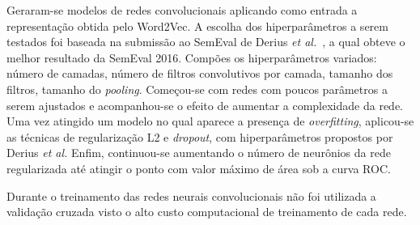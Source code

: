 Geraram-se modelos de redes convolucionais aplicando como entrada a representação obtida pelo Word2Vec.
A escolha dos hiperparâmetros a serem testados foi baseada na submissão ao SemEval de Derius
\textit{et al.}~\cite{deriu16}, a qual obteve o melhor resultado da SemEval 2016.
Compões os hiperparâmetros variados: número de camadas, número de filtros convolutivos por camada, tamanho dos filtros,
tamanho do \textit{pooling}.
Começou-se com redes com poucos parâmetros a serem ajustados e acompanhou-se o efeito de aumentar a complexidade da
rede.
Uma vez atingido um modelo no qual aparece a presença de \textit{overfitting}, aplicou-se as técnicas de regularização L2
e \textit{dropout}, com hiperparâmetros propostos por Derius \textit{et al.}
Enfim, continuou-se aumentando o número de neurônios da rede regularizada até atingir o ponto com valor máximo de área
sob a curva ROC.

Durante o treinamento das redes neurais convolucionais não foi utilizada a validação cruzada visto o alto custo
computacional de treinamento de cada rede.

